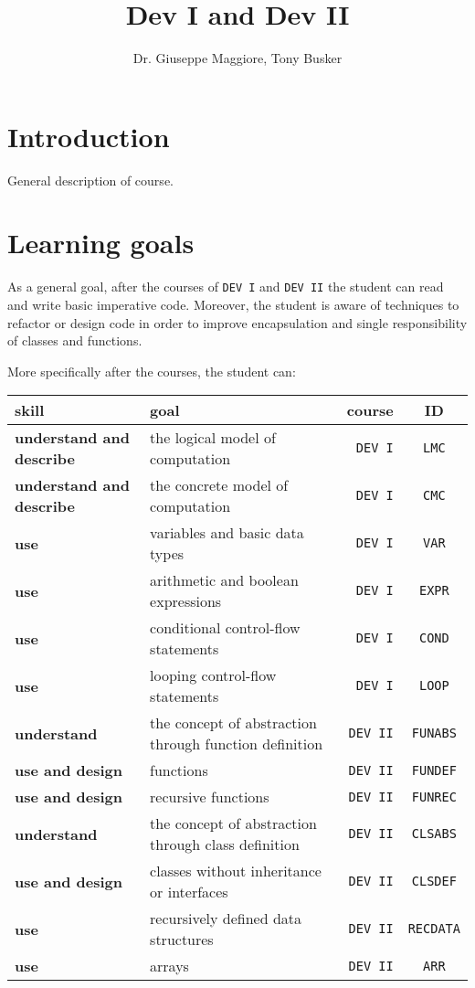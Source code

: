 \documentclass[12pt,a4paper,final]{article}
\author{Dr. Giuseppe Maggiore, Tony Busker}
\title{Dev I and Dev II}
\begin{document}
\maketitle

\section{Introduction}
General description of course.


\section{Learning goals}
As a general goal, after the courses of \texttt{DEV I} and \texttt{DEV II} the student can read and write basic imperative code. Moreover, the student is aware of techniques to refactor or design code in order to improve encapsulation and single responsibility of classes and functions.

More specifically after the courses, the student can:

\begin{tabular}{| l | p{7cm} | r | c | }
\hline
\textbf{skill} & \textbf{goal} & \textbf{course} & \textbf{ID} \\
\hline
\textbf{understand and describe} & the logical model of computation & \texttt{DEV I} & \texttt{LMC} \\
\hline
\textbf{understand and describe} & the concrete model of computation & \texttt{DEV I} & \texttt{CMC} \\
\hline
\textbf{use} & variables and basic data types & \texttt{DEV I} & \texttt{VAR}\\
\hline
\textbf{use} & arithmetic and boolean expressions & \texttt{DEV I} & \texttt{EXPR} \\
\hline
\textbf{use} & conditional control-flow statements & \texttt{DEV I} & \texttt{COND} \\
\hline
\textbf{use} & looping control-flow statements & \texttt{DEV I} & \texttt{LOOP} \\
\hline

\textbf{understand} & the concept of abstraction through function definition & \texttt{DEV II} & \texttt{FUNABS} \\
\hline
\textbf{use and design} & functions & \texttt{DEV II} & \texttt{FUNDEF} \\
\hline
\textbf{use and design} & recursive functions & \texttt{DEV II} & \texttt{FUNREC} \\
\hline
\textbf{understand} & the concept of abstraction through class definition & \texttt{DEV II} & \texttt{CLSABS} \\
\hline
\textbf{use and design} & classes without inheritance or interfaces & \texttt{DEV II} & \texttt{CLSDEF} \\
\hline
\textbf{use} & recursively defined data structures & \texttt{DEV II} & \texttt{RECDATA} \\
\hline
\textbf{use} & arrays & \texttt{DEV II} & \texttt{ARR} \\
\hline
\end{tabular}
\end{document}
